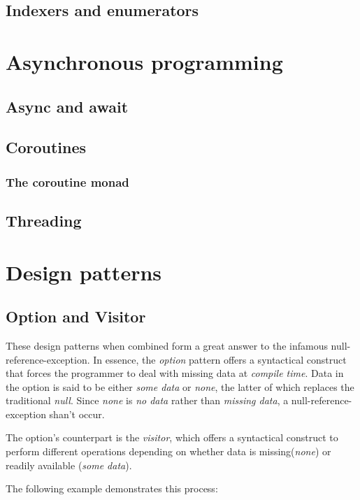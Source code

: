 \documentclass{article}
\begin{document}
\subsection{Indexers and enumerators}

\newpage

\section{Asynchronous programming}
\subsection{Async and await}
\subsection{Coroutines}
\subsubsection{The coroutine monad}
\subsection{Threading}

\newpage

\section{Design patterns}

\subsection{Option and Visitor}
These design patterns when combined form a great answer to the infamous null-reference-exception.
In essence, the {\em option} pattern offers a syntactical construct that forces the programmer to deal with missing data at {\em compile time}.
Data in the option is said to be either {\em some data} or {\em none}, the latter of which replaces the traditional {\em null}.
Since {\em none} is {\em no data} rather than {\em missing data}, a null-reference-exception shan't occur.

The option's counterpart is the {\em visitor}, which offers a syntactical construct to perform different operations depending on whether data
is missing({\em none}) or readily available ({\em some data}).

The following example demonstrates this process:
\end{document}
